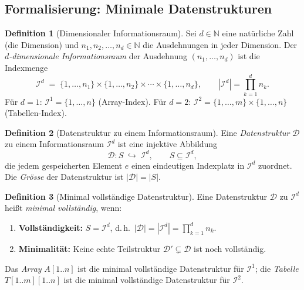 ﻿\documentclass[a4paper,12pt]{article}
\theoremstyle{definition}
\newtheorem{definition}{Definition}
\begin{document}
\subsection{Formalisierung: Minimale Datenstrukturen}

\begin{definition}[Dimensionaler Informationsraum]
    \label{def:dimraum}
    Sei $d \in \mathbb{N}$ eine nat\"{u}rliche Zahl (die Dimension) und
    $n_1, n_2, \ldots, n_d \in \mathbb{N}$ die Ausdehnungen in jeder Dimension.
    Der \emph{$d$-dimensionale Informationsraum} der Ausdehnung
    $(n_1, \ldots, n_d)$ ist die Indexmenge
    \[
        \mathcal{I}^d \;=\;
        \{1, \ldots, n_1\} \times \{1, \ldots, n_2\} \times \cdots
        \times \{1, \ldots, n_d\},
        \qquad |\mathcal{I}^d| = \prod_{k=1}^{d} n_k.
    \]
    F\"{u}r $d = 1$: $\mathcal{I}^1 = \{1, \ldots, n\}$ (Array-Index).
    F\"{u}r $d = 2$: $\mathcal{I}^2 = \{1, \ldots, m\} \times \{1, \ldots, n\}$
    (Tabellen-Index).
\end{definition}

\begin{definition}[Datenstruktur zu einem Informationsraum]
    Eine \emph{Datenstruktur} $\mathcal{D}$ zu einem Informationsraum $\mathcal{I}^d$
    ist eine injektive Abbildung
    \[
        \mathcal{D}: S \;\hookrightarrow\; \mathcal{I}^d,
        \qquad S \subseteq \mathcal{I}^d,
    \]
    die jedem gespeicherten Element $e$ einen eindeutigen Indexplatz in
    $\mathcal{I}^d$ zuordnet. Die \emph{Gr\"{o}sse} der Datenstruktur ist
    $|\mathcal{D}| = |S|$.
\end{definition}

\begin{definition}[Minimal vollst\"{a}ndige Datenstruktur]
    \label{def:minimal}
    Eine Datenstruktur $\mathcal{D}$ zu $\mathcal{I}^d$ hei\ss{}t
    \emph{minimal vollst\"{a}ndig}, wenn:
    \begin{enumerate}
        \item \textbf{Vollst\"{a}ndigkeit:} $S = \mathcal{I}^d$, d.\,h.\
              $|\mathcal{D}| = |\mathcal{I}^d| = \prod_{k=1}^d n_k$.
        \item \textbf{Minimalit\"{a}t:} Keine echte Teilstruktur
              $\mathcal{D}' \subsetneq \mathcal{D}$ ist noch vollst\"{a}ndig.
    \end{enumerate}
    Das \emph{Array} $A[1..n]$ ist die minimal vollst\"{a}ndige Datenstruktur
    f\"{u}r $\mathcal{I}^1$; die \emph{Tabelle} $T[1..m][1..n]$ ist die minimal
    vollst\"{a}ndige Datenstruktur f\"{u}r $\mathcal{I}^2$.
\end{definition}
\end{document}
